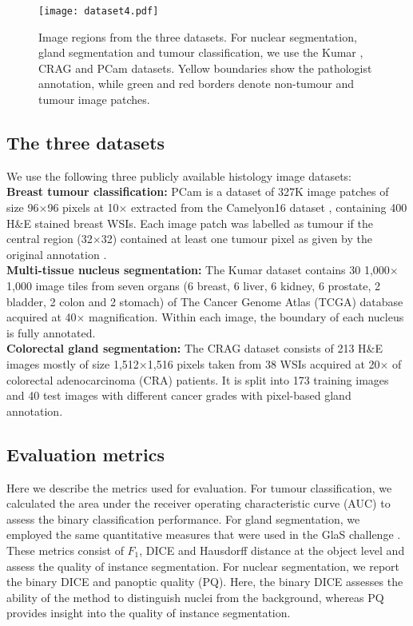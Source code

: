 \documentclass[journal]{IEEEtran}
\begin{document}
    		\begin{figure*}[t]
		\centering
        \texttt{[image: dataset4.pdf]}
		\caption{Image regions from the three datasets. For nuclear segmentation, gland segmentation and tumour classification, we use the Kumar \cite{kumar2017dataset}, CRAG \cite{graham2019mild} and PCam \cite{veeling2018rotation} datasets. Yellow boundaries show the pathologist annotation, while green and red borders denote non-tumour and tumour image patches.} 
		\label{fig:images}
	\end{figure*}
	
	\subsection{The three datasets} \label{section:datasets}
 	We use the following three publicly available histology image datasets:\\
 	\textbf{Breast tumour classification:} PCam \cite{veeling2018rotation} is a dataset of 327K image patches of size 96$\times$96 pixels at 10$\times$ extracted from the Camelyon16 dataset \cite{bejnordi2017diagnostic}, containing 400 H\&E stained breast WSIs. Each image patch was labelled as tumour if the central region (32$\times$32) contained at least one tumour pixel as given by the original annotation \cite{bejnordi2017diagnostic}.\\
	\textbf{Multi-tissue nucleus segmentation:} The Kumar \cite{kumar2017dataset} dataset contains 30 1,000$\times$1,000 image tiles from seven organs (6 breast, 6 liver, 6 kidney, 6 prostate, 2 bladder, 2 colon and 2 stomach) of The Cancer Genome Atlas (TCGA) database acquired at 40$\times$ magnification. Within each image, the boundary of each nucleus is fully annotated. \\
	\textbf{Colorectal gland segmentation:} The CRAG dataset \cite{graham2019mild} consists of 213 H\&E images mostly of size 1,512$\times$1,516 pixels taken from 38 WSIs acquired at 20$\times$ of colorectal adenocarcinoma (CRA) patients. It is split into 173 training images and 40 test images with different cancer grades with pixel-based gland annotation.
    
    \subsection{Evaluation metrics} \label{dup1 section:metrics}
    
    Here we describe the metrics used for evaluation. For tumour classification, we calculated the area under the receiver operating characteristic curve (AUC) to assess the binary classification performance. For gland segmentation, we employed the same quantitative measures that were used in the GlaS challenge \cite{sirinukunwattana2017gland}. These metrics consist of $F_1$, DICE and Hausdorff distance at the object level and assess the quality of instance segmentation. For nuclear segmentation, we report the binary DICE and panoptic quality (PQ). Here, the binary DICE assesses the ability of the method to distinguish nuclei from the background, whereas PQ provides insight into the quality of instance segmentation. 
    
\end{document}
